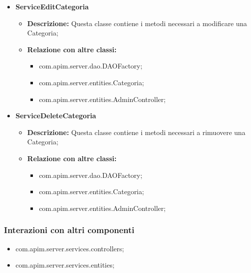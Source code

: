 {{{\begin{itemize}
\begin{itemize}
            \begin{itemize}
              \item com.apim.server.dao.DAOFactory;
              \item com.apim.server.entities.Categoria;
              \item com.apim.server.entities.AdminController;
            \end{itemize}
          \end{itemize}
          \item \textbf{ServiceEditCategoria}
          \begin{itemize}
            \item \textbf{Descrizione:} Questa classe contiene i metodi necessari a modificare una Categoria;
            \item \textbf{Relazione con altre classi:}
            \begin{itemize}
              \item com.apim.server.dao.DAOFactory;
              \item com.apim.server.entities.Categoria;
              \item com.apim.server.entities.AdminController;
            \end{itemize}
          \end{itemize}
          \item \textbf{ServiceDeleteCategoria}
          \begin{itemize}
            \item \textbf{Descrizione:} Questa classe contiene i metodi necessari a rimuovere una Categoria;
            \item \textbf{Relazione con altre classi:}
            \begin{itemize}
              \item com.apim.server.dao.DAOFactory;
              \item com.apim.server.entities.Categoria;
              \item com.apim.server.entities.AdminController;
            \end{itemize}
          \end{itemize}
       \end{itemize}
       \subsubsection{Interazioni con altri componenti}
          \begin{itemize}
            \item com.apim.server.services.controllers;
            \item com.apim.server.services.entities;
          \end{itemize}
          
}}}
